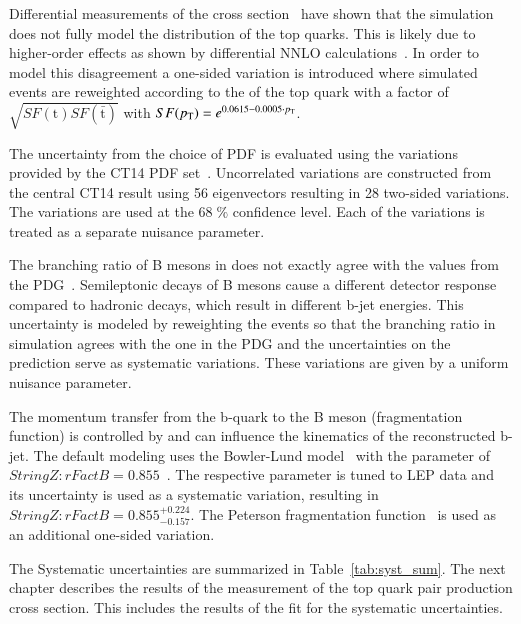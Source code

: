 Differential measurements of the \ttbar cross section~\cite{CMS-PAS-TOP-16-011} have shown that the simulation does not fully model the \pt distribution of the top quarks.
This is likely due to higher-order effects as shown by differential NNLO calculations~\cite{PhysRevLett.116.082003}. In order to model this disagreement a one-sided variation is introduced where simulated events are reweighted according to the \pt of the top quark with a factor of $\sqrt{SF(\mathrm{t})SF(\bar{\mathrm{t}})}$ with $SF(p_{\mathrm{T}})=e^{0.0615-0.0005\cdot p_{\mathrm{T}}}$.

The uncertainty from the choice of PDF is evaluated using the variations provided by the CT14 PDF set~\cite{Dulat:2015mca}. Uncorrelated variations are constructed from the central CT14 result using 56 eigenvectors resulting in 28 two-sided variations.
The variations are used at the $68 \;\%$ confidence level. Each of the variations is treated as a separate nuisance parameter.


The branching ratio of B mesons in \PYTHIA does not exactly agree with the values from the PDG~\cite{Olive:2016xmw}. Semileptonic decays of B mesons cause a different detector response compared to  hadronic decays,
which result in different b-jet energies.
This uncertainty is modeled by reweighting the events so that the branching ratio in simulation agrees with the one in the PDG and the uncertainties on the prediction serve as systematic
variations. These variations are given by a uniform nuisance parameter.

The momentum transfer from the b-quark to the B meson (fragmentation function) is controlled by \PYTHIA and can influence the kinematics of the reconstructed b-jet. 
The default modeling uses the Bowler-Lund model~\cite{Bowler1981} with the parameter of $StringZ:rFactB = 0.855$~\cite{Skands:2014pea,CMS-PAS-TOP-16-021}.
The respective parameter is tuned to LEP data and its uncertainty is used as a systematic variation, resulting in $StringZ:rFactB = 0.855^{+0.224}_{-0.157}$.
The Peterson fragmentation function~\cite{PhysRevD.27.105} is used as an additional one-sided variation. 

The Systematic uncertainties are summarized in Table~\ref{tab:syst_sum}.
The next chapter describes the results of the measurement of the top quark pair production cross section.
This includes the results of the fit for the systematic uncertainties.



